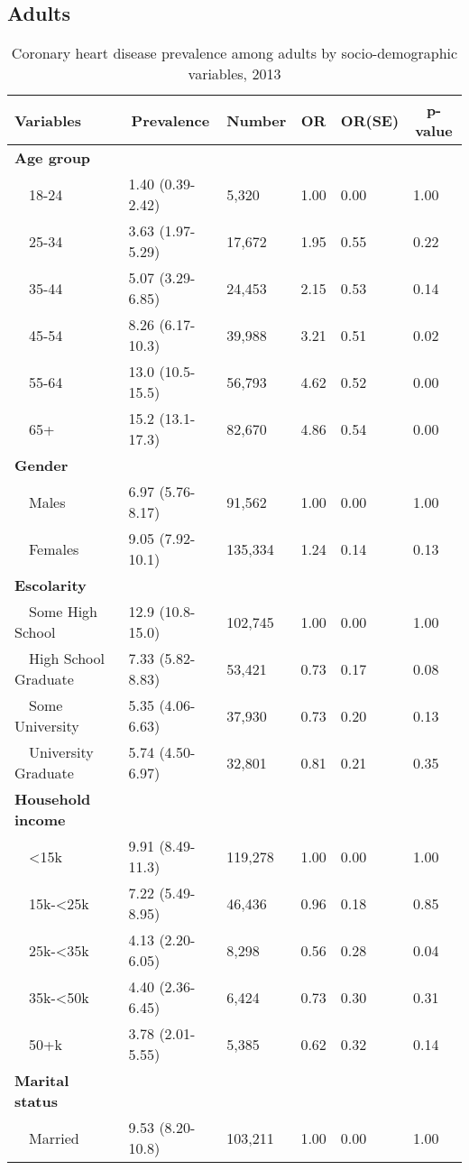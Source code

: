 \subsection{Adults}

 
\begin{table}[H]
\caption{Coronary heart disease prevalence  among adults by socio-demographic variables, 2013\label{tab:SocioD.tabl}} 
\begin{center}
\begin{tabular}{llllll}
\hline\hline
\multicolumn{1}{l}{Variables}&\multicolumn{1}{c}{Prevalence}&\multicolumn{1}{c}{Number}&\multicolumn{1}{c}{OR}&\multicolumn{1}{c}{OR(SE)}&\multicolumn{1}{c}{p-value}\tabularnewline
\hline
{\bfseries Age group}&&&&&\tabularnewline
~~18-24&1.40 (0.39-2.42)& 5,320&1.00&0.00&1.00\tabularnewline
~~25-34&3.63 (1.97-5.29)&17,672&1.95&0.55&0.22\tabularnewline
~~35-44&5.07 (3.29-6.85)&24,453&2.15&0.53&0.14\tabularnewline
~~45-54&8.26 (6.17-10.3)&39,988&3.21&0.51&0.02\tabularnewline
~~55-64&13.0 (10.5-15.5)&56,793&4.62&0.52&0.00\tabularnewline
~~65+&15.2 (13.1-17.3)&82,670&4.86&0.54&0.00\tabularnewline
\hline
{\bfseries Gender}&&&&&\tabularnewline
~~Males&6.97 (5.76-8.17)& 91,562&1.00&0.00&1.00\tabularnewline
~~Females&9.05 (7.92-10.1)&135,334&1.24&0.14&0.13\tabularnewline
\hline
{\bfseries Escolarity}&&&&&\tabularnewline
~~Some High School&12.9 (10.8-15.0)&102,745&1.00&0.00&1.00\tabularnewline
~~High School Graduate&7.33 (5.82-8.83)& 53,421&0.73&0.17&0.08\tabularnewline
~~Some University&5.35 (4.06-6.63)& 37,930&0.73&0.20&0.13\tabularnewline
~~University Graduate&5.74 (4.50-6.97)& 32,801&0.81&0.21&0.35\tabularnewline
\hline
{\bfseries Household income}&&&&&\tabularnewline
~~\textless15k&9.91 (8.49-11.3)&119,278&1.00&0.00&1.00\tabularnewline
~~15k-\textless25k&7.22 (5.49-8.95)& 46,436&0.96&0.18&0.85\tabularnewline
~~25k-\textless35k&4.13 (2.20-6.05)&  8,298&0.56&0.28&0.04\tabularnewline
~~35k-\textless50k&4.40 (2.36-6.45)&  6,424&0.73&0.30&0.31\tabularnewline
~~50+k&3.78 (2.01-5.55)&  5,385&0.62&0.32&0.14\tabularnewline
\hline
{\bfseries Marital status}&&&&&\tabularnewline
~~Married&9.53 (8.20-10.8)&103,211&1.00&0.00&1.00\tabularnewline

\end{tabular}
\end{center}
\end{table}
